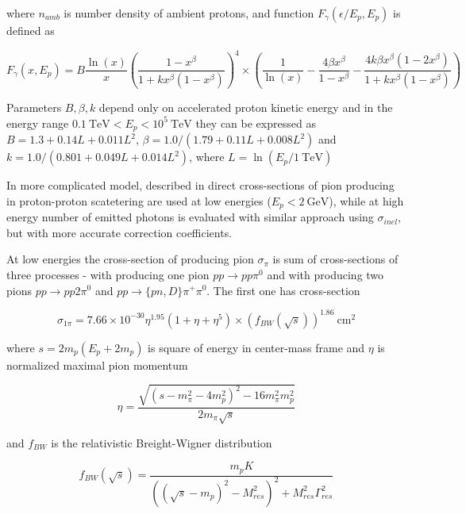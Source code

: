 where $n_{amb}$ is number density of ambient protons, and function $F_{\gamma}(\epsilon/E_p, E_p)$ is defined as

\begin{equation}
	F_{\gamma}(x, E_p) = B \frac{\ln(x)}{x} \left(\frac{1-x^\beta}{1+k x^{\beta}\left(1-x^\beta\right)}\right)^4\times\left(\frac{1}{\ln(x)}-\frac{4\beta x^\beta}{1-x^\beta}-\frac{4 k\beta x^\beta\left(1-2x^\beta\right)}{1+k x^\beta\left(1-x^\beta\right)}\right)
\end{equation}

Parameters $B, \beta, k$ depend only on accelerated proton kinetic energy and in the energy range $0.1~\text{TeV} < E_p < 10^5~\text{TeV}$ they can be expressed as $B = 1.3 + 0.14 L + 0.011 L^2$, $\beta = 1.0/\left(1.79 + 0.11 L  + 0.008 L^2\right)$ and $k = 1.0/\left(0.801 + 0.049 L + 0.014 L^2\right)$, where $L = \ln\left(E_p/1~\text{TeV}\right)$

In more complicated model, described in \cite{Kafexhiu} direct cross-sections of pion producing in proton-proton scatetering are used at low energies ($E_p < 2~\text{GeV}$), while at high energy number of emitted photons is evaluated with similar approach using $\sigma_{inel}$, but with more accurate correction coefficients.

At low energies the cross-section of producing pion $\sigma_{\pi}$ is sum of cross-sections of three processes - with producing one pion $pp\rightarrow pp\pi^0$ and with producing two pions $pp\rightarrow pp2\pi^0$ and $pp\rightarrow \{pn,D\}\pi^{+}\pi^0$. The first one has cross-section

\begin{equation}
	\sigma_{1\pi} = 7.66\times10^{-30}\eta^{1.95}\left(1 + \eta + \eta^5\right)\times\left(f_{BW}\left(\sqrt s\right)\right)^{1.86}~\text{cm}^{2}
\end{equation}

where $s = 2 m_p \left(E_p+2m_p\right)$ is square of energy in center-mass frame and $\eta$ is normalized maximal pion momentum

\begin{equation}
	\eta = \frac{\sqrt{\left(s-m_{\pi}^2-4m_p^2\right)^2-16 m_{\pi}^2m_p^2}}{2m_{\pi}\sqrt{s}}
\end{equation}

and $f_{BW}$ is the relativistic Breight-Wigner distribution

\begin{equation}
	f_{BW}\left(\sqrt{s}\right)=\frac{m_p K}{\left(\left(\sqrt{s}-m_p\right)^2-M_{res}^2\right)^2+M_{res}^2\Gamma_{res}^2}
\end{equation}

